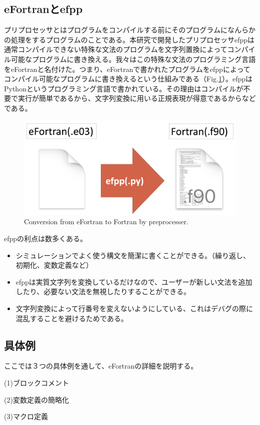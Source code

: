 \documentclass[12pt]{jsarticle}
\begin{document}
\subsection{eFortranとefpp}
プリプロセッサとはプログラムをコンパイルする前にそのプログラムになんらかの処理をするプログラムのことである。本研究で開発したプリプロセッサefppは通常コンパイルできない特殊な文法のプログラムを文字列置換によってコンパイル可能なプログラムに書き換える。我々はこの特殊な文法のプログラミング言語をeFortranと名付けた。つまり、eFortranで書かれたプログラムをefppによってコンパイル可能なプログラムに書き換えるという仕組みである（Fig.\ref{conversion}）。efppはPythonというプログラミング言語で書かれている。その理由はコンパイルが不要で実行が簡単であるから、文字列変換に用いる正規表現が得意であるからなどである。

\begin{figure}[H]
\centering
\includegraphics[height=0.5\textheight,width=1.0\hsize,angle=0,keepaspectratio]{./Image/conversion.png}
\caption{Conversion from eFortran to Fortran by preprocesser.} \label{conversion}
\end{figure}


efppの利点は数多くある。
\begin{itemize}
\item シミュレーションでよく使う構文を簡潔に書くことができる。（繰り返し、初期化、変数定義など）
\item efppは実質文字列を変換しているだけなので、ユーザーが新しい文法を追加したり、必要ない文法を無視したりすることができる。
\item 文字列変換によって行番号を変えないようにしている、これはデバグの際に混乱することを避けるためである。
\end{itemize}

\subsection{具体例}
ここでは３つの具体例を通して、eFortranの詳細を説明する。
\begin{description}
\item{(1)}ブロックコメント
\item{(2)}変数定義の簡略化
\item{(3)}マクロ定義
\end{description}
\end{document}
